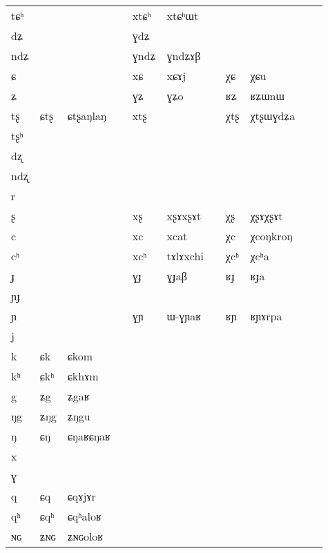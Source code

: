 \documentclass[oldfontcommands,oneside,a4paper,11pt]{article}
\newcommand{\ipa}[1]{{\phon #1}} %
\begin{document}
\begin{table}
{\begin{tabular}{l|lll|lll|lll|l}
\ipa{tɕʰ}  &	  &	  &	&	\ipa{xtɕʰ}  &	\ipa{xtɕʰɯt}  &	&	  &	  &	\\
\ipa{dʑ}  &	  &	  &	&	\ipa{ɣdʑ}  &	  &	&	  &	  &	\\
\ipa{ndʑ}  &	  &	  &	&	\ipa{ɣndʑ}  &	\ipa{ɣndʑɤβ}  &	&	  &	  &	\\
\ipa{ɕ}  &	  &	  &	&	\ipa{xɕ}  &	\ipa{xɕɤj}  &	&	\ipa{χɕ}  &	\ipa{χɕu}  &	\\
\ipa{ʑ}  &	  &	  &	&	\ipa{ɣʑ}  &	\ipa{ɣʑo}  &	&	\ipa{ʁʑ}  &	\ipa{ʁʑɯnɯ}  &	\\
\ipa{tʂ}  &	\ipa{ɕtʂ}  &	\ipa{ɕtʂaŋlaŋ}  &	&	\ipa{xtʂ}  &	  &	&	\ipa{χtʂ}  &	\ipa{χtʂɯɣdʑa}  &	\\
\ipa{tʂʰ}  &	  &	  &	&	  &	  &	&	  &	  &	\\
\ipa{dʐ}  &	  &	  &	&	  &	  &	&	  &	  &	\\
\ipa{ndʐ}  &	  &	  &	&	  &	  &	&	  &	  &	\\
\ipa{r}  &	  &	  &	&	  &	  &	&	  &	  &	\\
\ipa{ʂ}  &	  &	  &	&	\ipa{xʂ}  &	\ipa{xʂɤxʂɤt }  &	&	\ipa{χʂ}  &	\ipa{χʂɤχʂɤt}  &	\\
\ipa{c}  &	  &	  &	&	\ipa{xc}  &	\ipa{xcat}  &	&	\ipa{χc}  &	\ipa{χcoŋkroŋ}  &	\\
\ipa{cʰ}  &	  &	  &	&	\ipa{xcʰ}  &	\ipa{tɤlɤxchi}  &	&	\ipa{χcʰ}  &	\ipa{χcʰa}  &	\\
\ipa{ɟ}  &	  &	  &	&	\ipa{ɣɟ}  &	\ipa{ɣɟaβ}  &	&	\ipa{ʁɟ}  &	\ipa{ʁɟa}  &	\\
\ipa{ɲɟ}  &	  &	  &	&	  &	  &	&	  &	  &	\\
\ipa{ɲ}  &	  &	  &	&	\ipa{ɣɲ}  &	\ipa{ɯ-ɣɲaʁ}  &	&	\ipa{ʁɲ}  &	\ipa{ʁɲɤrpa}  &	\\
\ipa{j}  &	  &	  &	&	  &	  &	&	  &	  &	\\
\ipa{k}  &	\ipa{ɕk}  &	\ipa{ɕkom}  &	&	  &	  &	&	  &	  &	\\
\ipa{kʰ}  &	\ipa{ɕkʰ}  &	\ipa{ɕkhɤm}  &	&	  &	  &	&	  &	  &	\\
\ipa{g}  &	\ipa{ʑg}  &	\ipa{ʑgaʁ}  &	&	  &	  &	&	  &	  &	\\
\ipa{ŋg}  &	\ipa{ʑŋg}  &	\ipa{ʑŋgu}  &	&	  &	  &	&	  &	  &	\\
\ipa{ŋ}  &	\ipa{ɕŋ}  &	\ipa{ɕŋaʁɕŋaʁ}  &	&	  &	  &	&	  &	  &	\\
\ipa{x}  &	  &	  &	&	  &	  &	&	  &	  &	\\
\ipa{ɣ}  &	  &	  &	&	  &	  &	&	  &	  &	\\
\ipa{q}  &	\ipa{ɕq}  &	\ipa{ɕqɤjɤr}  &	&	  &	  &	&	  &	  &	\\
\ipa{qʰ}  &	\ipa{ɕqʰ}  &	\ipa{ɕqʰaloʁ}  &	&	  &	  &	&	  &	  &	\\
\ipa{ɴɢ}  &	\ipa{ʑɴɢ}  &	\ipa{ʑɴɢoloʁ}  &	&	  &	  &	&	  &	  &	\\

\end{tabular}}
\end{table}
\end{document}
